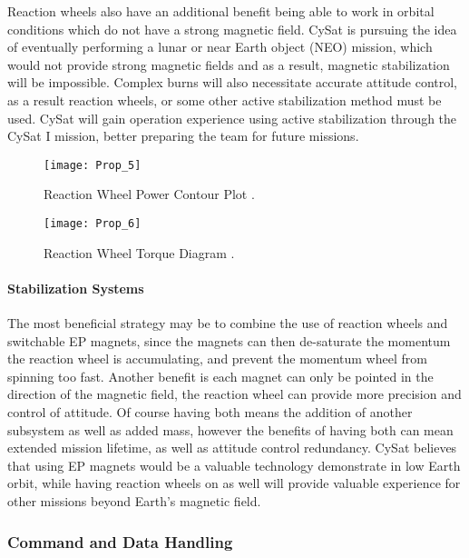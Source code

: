 \documentclass[nocover]            %
{CSLI}                       %
\begin{document}
Reaction wheels also have an additional benefit being able to work in orbital conditions which do not have a strong magnetic field. CySat is pursuing the idea of eventually performing a lunar or near Earth object (NEO) mission, which would not provide strong magnetic fields and as a result, magnetic stabilization will be impossible. Complex burns will also necessitate accurate attitude control, as a result reaction wheels, or some other active stabilization method must be used. CySat will gain operation experience using active stabilization through the CySat I mission, better preparing the team for future missions.

\begin{figure}[H]
\centering
    \texttt{[image: Prop\_5]}
    \caption{Reaction Wheel Power Contour Plot \cite{Votel}.}
\end{figure}

\begin{figure}[H]
\centering
    \texttt{[image: Prop\_6]}
    \caption{Reaction Wheel Torque Diagram \cite{Votel}.}
\end{figure}

\paragraph{Stabilization Systems\\}
The most beneficial strategy may be to combine the use of reaction wheels and switchable EP magnets, since the magnets can then de-saturate the momentum the reaction wheel is accumulating, and prevent the momentum wheel from spinning too fast. Another benefit is each magnet can only be pointed in the direction of the magnetic field, the reaction wheel can provide more precision and control of attitude. Of course having both means the addition of another subsystem as well as added mass, however the benefits of having both can mean extended mission lifetime, as well as attitude control redundancy. CySat believes that using EP magnets would be a valuable technology demonstrate in low Earth orbit, while having reaction wheels on as well will provide valuable experience for other missions beyond Earth's magnetic field.
\subsubsection{Command and Data Handling}
\end{document}
